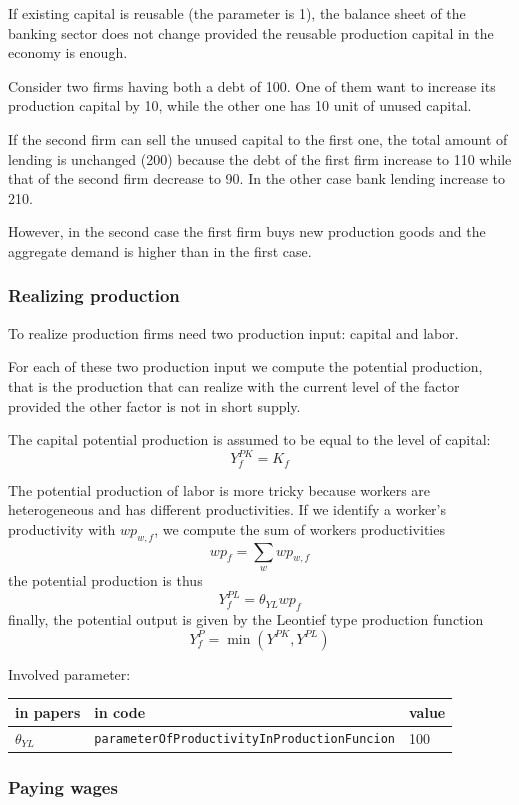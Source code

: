 \documentclass{article}
\begin{document}
If existing capital is reusable (the parameter is 1), the balance sheet of the banking sector does not change provided the reusable production capital in the economy is enough.

Consider two firms having both a debt of 100. One of them want to increase its production capital by 10, while the other one has 10 unit of unused capital. 

If the second firm can sell the unused capital to the first one, the total amount of lending is unchanged (200) because the debt of the first firm increase to 110 while that of the second firm decrease to 90.
In the other case bank lending increase to 210.

However, in the second case the first firm buys new production goods and the aggregate demand is higher than in the first case. 
\subsubsection{Realizing production}
To realize production firms need two production input: capital and labor.

For each of these two production input we compute the potential production, that is the production that can realize with the current level of the factor provided the other factor is not in short supply.

The capital potential production is assumed to be equal to the level of capital:
\[
	Y^{PK}_f=K_f
\]

The potential production of labor is more tricky because workers are heterogeneous and has different productivities.
If we identify a worker's productivity with $wp_{w,f}$, we compute the sum of workers productivities
\[
	wp_f=\sum_{w}wp_{w,f}
\]
the potential production is thus
\[
	Y^{PL}_f=\theta_{YL}wp_f
\]
finally, the potential output is given by the Leontief type production function
\[
Y^P_f=\min(Y^{PK},Y^{PL})
\]

Involved parameter:

\begin{tabular}{l l l}
	\hline
	in papers& in code&value\\
	\hline
	\hline
$\theta_{YL}$&\verb+parameterOfProductivityInProductionFuncion+&100\\
	\hline
\end{tabular}

\subsubsection{Paying wages}
\end{document}
